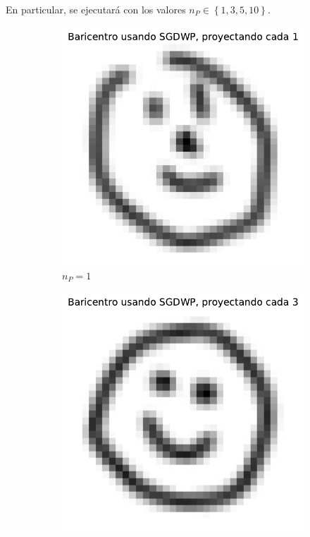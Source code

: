 En particular, se ejecutará con los valores $n_P \in \left\{ 1, 3, 5, 10 \right\}$.

\begin{figure}[htbp]
    \centering
    \begin{subfigure}[b]{0.23\textwidth}
        \centering
        \includegraphics[width=\textwidth]{img/sgdwp-pe/bar-SGDWP-pe-01.pdf}
        \caption{$n_P=1$}
        \label{fig:bar-SGDWP-pe-01}
    \end{subfigure}
    \hfill
    \begin{subfigure}[b]{0.23\textwidth}
        \centering
        \includegraphics[width=\textwidth]{img/sgdwp-pe/bar-SGDWP-pe-03.pdf}

\end{subfigure}
\end{figure}
